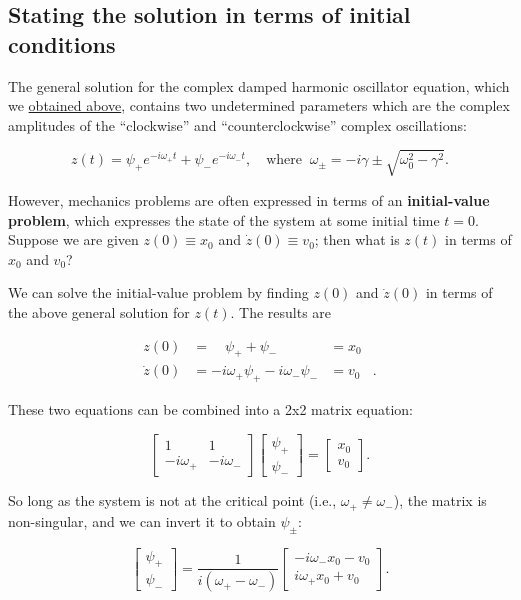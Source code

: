 \documentclass[11pt]{article}
\begin{document}
    \subsection{Stating the solution in terms of initial
conditions}\label{stating-the-solution-in-terms-of-initial-conditions}

The general solution for the complex damped harmonic oscillator
equation, which we \protect\hyperlink{ansatz}{obtained above}, contains
two undetermined parameters which are the complex amplitudes of the
``clockwise'' and ``counterclockwise'' complex oscillations:

\[z(t) = \psi_+ e^{-i\omega_+ t} + \psi_- e^{-i\omega_- t}, \quad\mathrm{where} \;\; \omega_\pm =  -i\gamma  \pm \sqrt{\omega_0^2 - \gamma^2}.\]

However, mechanics problems are often expressed in terms of an
\textbf{initial-value problem}, which expresses the state of the system
at some initial time \(t = 0\). Suppose we are given \(z(0) \equiv x_0\)
and \(\dot{z}(0) \equiv v_0\); then what is \(z(t)\) in terms of \(x_0\)
and \(v_0\)?

We can solve the initial-value problem by finding \(z(0)\) and
\(\dot{z}(0)\) in terms of the above general solution for \(z(t)\). The
results are

\[\begin{aligned} z(0) &= \quad \psi_+ + \psi_- &= x_0& \\ \dot{z}(0) &= -i\omega_+ \psi_+ - i \omega_- \psi_- &= v_0&.\end{aligned}\]

These two equations can be combined into a 2x2 matrix equation:

\[\begin{bmatrix}1 & 1 \\ -i\omega_+ & -i\omega_-\end{bmatrix} \begin{bmatrix}\psi_+ \\ \psi_-\end{bmatrix} = \begin{bmatrix}x_0 \\ v_0\end{bmatrix}.\]

So long as the system is not at the critical point (i.e.,
\(\omega_+ \ne \omega_-\)), the matrix is non-singular, and we can
invert it to obtain \(\psi_\pm\):

\[\begin{bmatrix}\psi_+ \\ \psi_-\end{bmatrix} = \frac{1}{i(\omega_+-\omega_-)}\begin{bmatrix}-i\omega_-x_0 - v_0 \\ i\omega_+x_0 + v_0 \end{bmatrix}.\]
\end{document}

